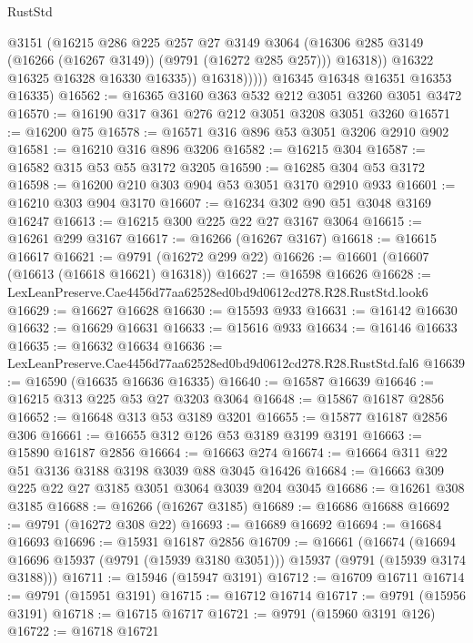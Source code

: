 \begin{lexlean}{RustStd}
\begin{coremodule}
                      @3151
                      (@16215
                        @286
                        @225
                        @257
                        @27
                        @3149
                        @3064
                        (@16306 @285 @3149 (@16266 (@16267 @3149)) (@9791 (@16272 @285 @257)))
                        @16318))
                    @16322
                    @16325
                    @16328
                    @16330
                    @16335))
                @16318)))))
      @16345
      @16348
      @16351
      @16353
      @16335)
@16562 := @16365 @3160 @363 @532 @212 @3051 @3260 @3051 @3472
@16570 := @16190 @317 @361 @276 @212 @3051 @3208 @3051 @3260
@16571 := @16200 @75
@16578 := @16571 @316 @896 @53 @3051 @3206 @2910 @902
@16581 := @16210 @316 @896 @3206
@16582 := @16215 @304
@16587 := @16582 @315 @53 @55 @3172 @3205
@16590 := @16285 @304 @53 @3172
@16598 := @16200 @210 @303 @904 @53 @3051 @3170 @2910 @933
@16601 := @16210 @303 @904 @3170
@16607 := @16234 @302 @90 @51 @3048 @3169 @16247
@16613 := @16215 @300 @225 @22 @27 @3167 @3064
@16615 := @16261 @299 @3167
@16617 := @16266 (@16267 @3167)
@16618 := @16615 @16617
@16621 := @9791 (@16272 @299 @22)
@16626 := @16601 (@16607 (@16613 (@16618 @16621) @16318))
@16627 := @16598 @16626
@16628 := LexLeanPreserve.Cae4456d77aa62528ed0bd9d0612cd278.R28.RustStd.look6
@16629 := @16627 @16628
@16630 := @15593 @933
@16631 := @16142 @16630
@16632 := @16629 @16631
@16633 := @15616 @933
@16634 := @16146 @16633
@16635 := @16632 @16634
@16636 := LexLeanPreserve.Cae4456d77aa62528ed0bd9d0612cd278.R28.RustStd.fal6
@16639 := @16590 (@16635 @16636 @16335)
@16640 := @16587 @16639
@16646 := @16215 @313 @225 @53 @27 @3203 @3064
@16648 := @15867 @16187 @2856
@16652 := @16648 @313 @53 @3189 @3201
@16655 := @15877 @16187 @2856 @306
@16661 := @16655 @312 @126 @53 @3189 @3199 @3191
@16663 := @15890 @16187 @2856
@16664 := @16663 @274
@16674 := @16664 @311 @22 @51 @3136 @3188 @3198 @3039 @88 @3045 @16426
@16684 := @16663 @309 @225 @22 @27 @3185 @3051 @3064 @3039 @204 @3045
@16686 := @16261 @308 @3185
@16688 := @16266 (@16267 @3185)
@16689 := @16686 @16688
@16692 := @9791 (@16272 @308 @22)
@16693 := @16689 @16692
@16694 := @16684 @16693
@16696 := @15931 @16187 @2856
@16709 := @16661
    (@16674 (@16694 @16696 @15937 (@9791 (@15939 @3180 @3051))) @15937 (@9791 (@15939 @3174 @3188)))
@16711 := @15946 (@15947 @3191)
@16712 := @16709 @16711
@16714 := @9791 (@15951 @3191)
@16715 := @16712 @16714
@16717 := @9791 (@15956 @3191)
@16718 := @16715 @16717
@16721 := @9791 (@15960 @3191 @126)
@16722 := @16718 @16721

\end{coremodule}
\end{lexlean}

